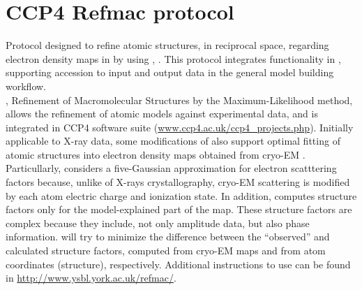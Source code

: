 \section{CCP4 Refmac protocol}
\label{app:ccp4Refmac}%

Protocol designed to refine atomic structures, in reciprocal space, regarding electron density maps in \scipion by using  \citep{vagin2004}, \citep{kovalevskiy2018}. This protocol integrates  functionality in \scipion, supporting accession to  input and output data in the general model building workflow.\\, Refinement of Macromolecular Structures by the Maximum-Likelihood method, allows the refinement of atomic models against experimental data, and is integrated in CCP4 software suite (\url{www.ccp4.ac.uk/ccp4\_projects.php}). Initially applicable to X-ray data, some modifications of  also support optimal fitting of atomic structures into electron density maps obtained from cryo-EM \citep{brown2015}. Particullarly,  considers a five-Gaussian approximation for electron scatttering factors because, unlike of X-rays crystallography, cryo-EM scattering is modified by each atom electric charge and ionization state. In addition,  computes structure factors only for the model-explained part of the map. These structure factors are complex because they include, not only amplitude data, but also phase information.  will try to minimize the difference between the ``observed'' and calculated structure factors, computed from cryo-EM maps and from atom coordinates (structure), respectively. Additional instructions to use  can be found in \url{http://www.ysbl.york.ac.uk/refmac/}.  

